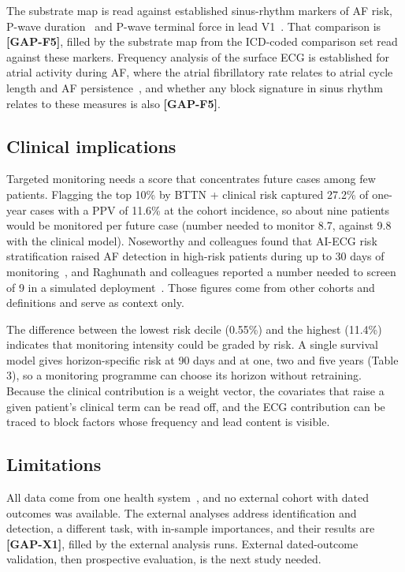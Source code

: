 \documentclass[preprint,12pt]{elsarticle}
\begin{document}
The substrate map is read against established sinus-rhythm markers of AF risk, P-wave duration~\cite{nielsen2015} and P-wave terminal force in lead V1~\cite{huang2020,wolder2023}. That comparison is \textbf{[GAP-F5]}, filled by the substrate map from the ICD-coded comparison set read against these markers. Frequency analysis of the surface ECG is established for atrial activity during AF, where the atrial fibrillatory rate relates to atrial cycle length and AF persistence~\cite{bollmann2006,platonov2014}, and whether any block signature in sinus rhythm relates to these measures is also \textbf{[GAP-F5]}.

\subsection{Clinical implications}

Targeted monitoring needs a score that concentrates future cases among few patients. Flagging the top 10\% by BTTN + clinical risk captured 27.2\% of one-year cases with a PPV of 11.6\% at the cohort incidence, so about nine patients would be monitored per future case (number needed to monitor 8.7, against 9.8 with the clinical model). Noseworthy and colleagues found that AI-ECG risk stratification raised AF detection in high-risk patients during up to 30 days of monitoring~\cite{noseworthy2022}, and Raghunath and colleagues reported a number needed to screen of 9 in a simulated deployment~\cite{raghunath2021}. Those figures come from other cohorts and definitions and serve as context only.

The difference between the lowest risk decile (0.55\%) and the highest (11.4\%) indicates that monitoring intensity could be graded by risk. A single survival model gives horizon-specific risk at 90 days and at one, two and five years (Table 3), so a monitoring programme can choose its horizon without retraining. Because the clinical contribution is a weight vector, the covariates that raise a given patient's clinical term can be read off, and the ECG contribution can be traced to block factors whose frequency and lead content is visible.

\subsection{Limitations}

All data come from one health system~\cite{johnson2023}, and no external cohort with dated outcomes was available. The external analyses address identification and detection, a different task, with in-sample importances, and their results are \textbf{[GAP-X1]}, filled by the external analysis runs. External dated-outcome validation, then prospective evaluation, is the next study needed.
\end{document}

